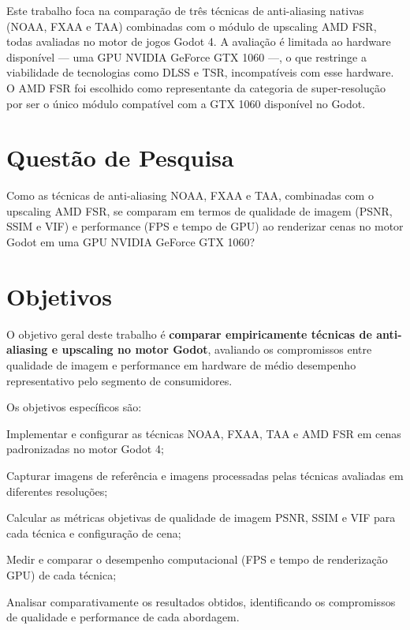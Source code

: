 \documentclass[twoside,english,brazilian]{UNISINOSmonografia}
\begin{document}
Este trabalho foca na comparação de três técnicas de anti-aliasing nativas (NOAA, FXAA e TAA) combinadas com o módulo de upscaling AMD FSR, todas avaliadas no motor de jogos Godot 4. A avaliação é limitada ao hardware disponível — uma GPU NVIDIA GeForce GTX 1060 —, o que restringe a viabilidade de tecnologias como DLSS e TSR, incompatíveis com esse hardware. O AMD FSR foi escolhido como representante da categoria de super-resolução por ser o único módulo compatível com a GTX 1060 disponível no Godot.

\section{Questão de Pesquisa}

Como as técnicas de anti-aliasing NOAA, FXAA e TAA, combinadas com o upscaling AMD FSR, se comparam em termos de qualidade de imagem (PSNR, SSIM e VIF) e performance (FPS e tempo de GPU) ao renderizar cenas no motor Godot em uma GPU NVIDIA GeForce GTX 1060?

\section{Objetivos}

O objetivo geral deste trabalho é \textbf{comparar empiricamente técnicas de anti-aliasing e upscaling no motor Godot}, avaliando os compromissos entre qualidade de imagem e performance em hardware de médio desempenho representativo pelo segmento de consumidores.

Os objetivos específicos são:

\begin{alineas}
    \item Implementar e configurar as técnicas NOAA, FXAA, TAA e AMD FSR em cenas padronizadas no motor Godot 4;
    \item Capturar imagens de referência e imagens processadas pelas técnicas avaliadas em diferentes resoluções;
    \item Calcular as métricas objetivas de qualidade de imagem PSNR, SSIM e VIF para cada técnica e configuração de cena;
    \item Medir e comparar o desempenho computacional (FPS e tempo de renderização GPU) de cada técnica;
    \item Analisar comparativamente os resultados obtidos, identificando os compromissos de qualidade e performance de cada abordagem.
\end{alineas}
\end{document}
